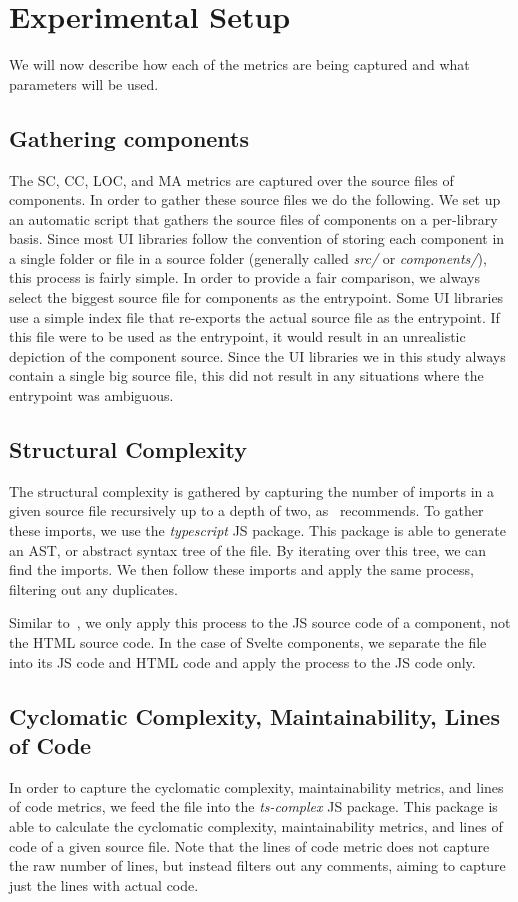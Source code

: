 \section{Experimental Setup}
We will now describe how each of the metrics are being captured and what parameters will be used.

\subsection{Gathering components}\label{sec:experimental-setup:gathering-components}
The SC, CC, LOC, and MA metrics are captured over the source files of components. In order to gather these source files we do the following. We set up an automatic script that gathers the source files of components on a per-library basis. Since most UI libraries follow the convention of storing each component in a single folder or file in a source folder (generally called \emph{src/} or \emph{components/}), this process is fairly simple. In order to provide a fair comparison, we always select the biggest source file for components as the entrypoint. Some UI libraries use a simple index file that re-exports the actual source file as the entrypoint. If this file were to be used as the entrypoint, it would result in an unrealistic depiction of the component source. Since the UI libraries we in this study always contain a single big source file, this did not result in any situations where the entrypoint was ambiguous.

\subsection{Structural Complexity}
The structural complexity is gathered by capturing the number of imports in a given source file recursively up to a depth of two, as~\cite{martinez-ortiz2016quality} recommends. To gather these imports, we use the \emph{typescript} JS package. This package is able to generate an AST, or abstract syntax tree of the file. By iterating over this tree, we can find the imports. We then follow these imports and apply the same process, filtering out any duplicates.

Similar to~\cite{martinez-ortiz2016quality}, we only apply this process to the JS source code of a component, not the HTML source code. In the case of Svelte components, we separate the file into its JS code and HTML code and apply the process to the JS code only.

\subsection{Cyclomatic Complexity, Maintainability, Lines of Code}
In order to capture the cyclomatic complexity, maintainability metrics, and lines of code metrics, we feed the file into the \emph{ts-complex} JS package. This package is able to calculate the cyclomatic complexity, maintainability metrics, and lines of code of a given source file. Note that the lines of code metric does not capture the raw number of lines, but instead filters out any comments, aiming to capture just the lines with actual code.

